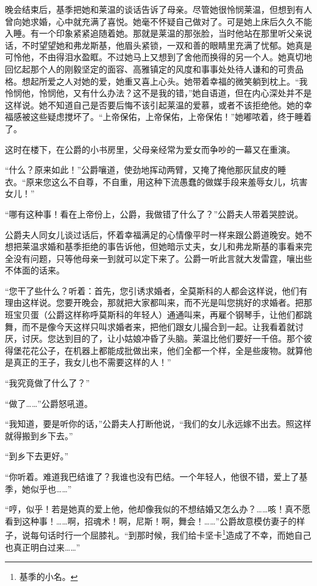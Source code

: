 \par 晚会结束后，基季把她和莱温的谈话告诉了母亲。尽管她很怜悯莱温，但想到有人曾向她求婚，心中就充满了喜悦。她毫不怀疑自己做对了。可是她上床后久久不能入睡。有一个印象紧紧追随着她。那就是莱温的那张脸，当时他站在那里听父亲说话，不时望望她和弗龙斯基，他眉头紧锁，一双和善的眼睛里充满了忧郁。她真是可怜他，不由得泪水盈眶。不过她马上又想到了舍他而换得的另一个人。她真切地回忆起那个人的刚毅坚定的面容、高雅镇定的风度和事事处处待人谦和的可贵品格。想起所爱之人对她的爱，她重又喜上心头。她带着幸福的微笑躺到枕上。“我怜悯他，怜悯他，又有什么办法？这不是我的错，”她自语道，但在内心深处并不是这样说。她不知道自己是否要后悔不该引起莱温的爱慕，或者不该拒绝他。她的幸福感被这些疑虑搅坏了。“上帝保佑，上帝保佑，上帝保佑！”她嘟哝着，终于睡着了。
\par 这时在楼下，在公爵的小书房里，父母亲经常为爱女而争吵的一幕又在重演。
\par “什么？原来如此！”公爵嚷道，使劲地挥动两臂，又掩了掩他那灰鼠皮的睡衣。“原来您这么不自尊，不自重，用这种下流愚蠢的做媒手段来羞辱女儿，坑害女儿！”
\par “哪有这种事！看在上帝份上，公爵，我做错了什么了？”公爵夫人带着哭腔说。
\par 公爵夫人同女儿谈过话后，怀着幸福满足的心情像平时一样来跟公爵道晚安。她不想把莱温求婚和基季拒绝的事告诉他，但她暗示丈夫，女儿和弗龙斯基的事看来完全没有问题，只等他母亲一到就可以定下来了。公爵一听此言就大发雷霆，嚷出些不体面的话来。
\par “您干了些什么？听着：首先，您引诱求婚者，全莫斯科的人都会这样说，他们有理由这样说。您要开晚会，那就把大家都叫来，而不光是叫您挑好的求婚者。把那班宝贝蛋（公爵这样称呼莫斯科的年轻人）通通叫来，再雇个钢琴手，让他们都跳舞，而不是像今天这样只叫求婚者来，把他们跟女儿撮合到一起。让我看着就讨厌，讨厌。您达到目的了，让小姑娘冲昏了头脑。莱温比他们要好一千倍。那个彼得堡花花公子，在机器上都能成批做出来，他们全都一个样，全是些废物。就算他是真正的王子，我女儿也不需要这样的人！”
\par “我究竟做了什么了？”
\par “做了……”公爵怒吼道。
\par “我知道，要是听你的话，”公爵夫人打断他说，“我们的女儿永远嫁不出去。照这样就得搬到乡下去。”
\par “到乡下去更好。”
\par “你听着。难道我巴结谁了？我谁也没有巴结。一个年轻人，他很不错，爱上了基季，她似乎也……”
\par “哼，似乎！若是她真的爱上他，他却像我似的不想结婚又怎么办？……咳！真不愿看到这种事！……啊，招魂术！啊，尼斯！啊，舞会！……”公爵故意模仿妻子的样子，说每句话时行一个屈膝礼。“到那时候，我们给卡坚卡\footnote{基季的小名。}造成了不幸，而她自己也真正明白过来……”
